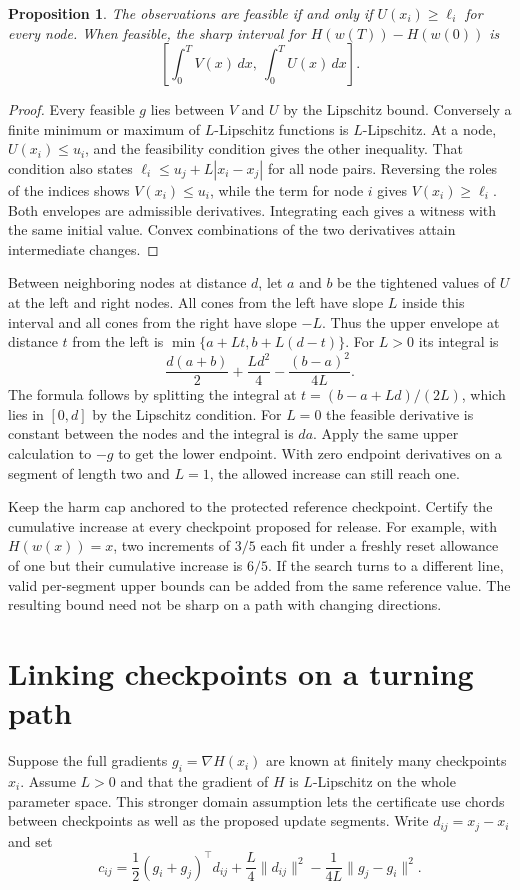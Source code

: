 \documentclass[11pt]{article}
\newtheorem{proposition}{Proposition}
\begin{document}
\begin{proposition}
The observations are feasible if and only if
$U(x_i)\ge\ell_i$ for every node. When feasible, the sharp
interval for $H(w(T))-H(w(0))$ is
\[
 \left[\int_0^T V(x)\,dx,\ \int_0^T U(x)\,dx\right].
\]
\end{proposition}
\begin{proof}
Every feasible $g$ lies between $V$ and $U$ by the Lipschitz
bound. Conversely a finite minimum or maximum of
$L$-Lipschitz functions is $L$-Lipschitz. At a node,
$U(x_i)\le u_i$, and the feasibility condition gives the
other inequality. That condition also states
$\ell_i\le u_j+L|x_i-x_j|$ for all node pairs. Reversing the
roles of the indices shows $V(x_i)\le u_i$, while the term
for node $i$ gives $V(x_i)\ge\ell_i$. Both envelopes are
admissible derivatives. Integrating each gives a witness
with the same initial value. Convex combinations of the two
derivatives attain intermediate changes.
\end{proof}

Between neighboring nodes at distance $d$, let $a$ and $b$
be the tightened values of $U$ at the left and right nodes.
All cones from the left have slope $L$ inside this interval
and all cones from the right have slope $-L$. Thus the
upper envelope at distance $t$ from the left is
$\min\{a+Lt,b+L(d-t)\}$. For $L>0$ its integral is
\[
 \frac{d(a+b)}{2}+\frac{Ld^2}{4}-\frac{(b-a)^2}{4L}.
\]
The formula follows by splitting the integral at
$t=(b-a+Ld)/(2L)$, which lies in $[0,d]$ by the Lipschitz
condition. For $L=0$ the feasible derivative is constant
between the nodes and the integral is $da$. Apply the same
upper calculation to $-g$ to get the lower endpoint.
With zero endpoint derivatives on a segment of length two
and $L=1$, the allowed increase can still reach one.

Keep the harm cap anchored to the protected reference
checkpoint. Certify the cumulative increase at every checkpoint
proposed for release. For example, with $H(w(x))=x$, two
increments of $3/5$ each fit under a freshly reset allowance
of one but their cumulative increase is $6/5$. If the search
turns to a different line, valid per-segment upper bounds can
be added from the same reference value. The resulting bound
need not be sharp on a path with changing directions.

\section{Linking checkpoints on a turning path}
Suppose the full gradients $g_i=\nabla H(x_i)$ are known at
finitely many checkpoints $x_i$. Assume $L>0$ and that the
gradient of $H$ is $L$-Lipschitz on the whole parameter space.
This stronger domain assumption lets the certificate use chords
between checkpoints as well as the proposed update segments.
Write $d_{ij}=x_j-x_i$ and set
\[
 c_{ij}=\frac12(g_i+g_j)^\top d_{ij}
 +\frac L4\lVert d_{ij}\rVert^2
 -\frac1{4L}\lVert g_j-g_i\rVert^2 .
\]
\end{document}
